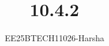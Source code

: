 \documentclass[journal]{IEEEtran}
\begin{document}

\vspace{3cm}

\title{10.4.2}
\author{EE25BTECH11026-Harsha}
 \maketitle
{\let\newpage\relax\maketitle}

\renewcommand{\thefigure}{\theenumi}
\renewcommand{\thetable}{\theenumi}
\setlength{\intextsep}{10pt} %


\renewcommand{\thetable}{\theenumi}
\end{document}
